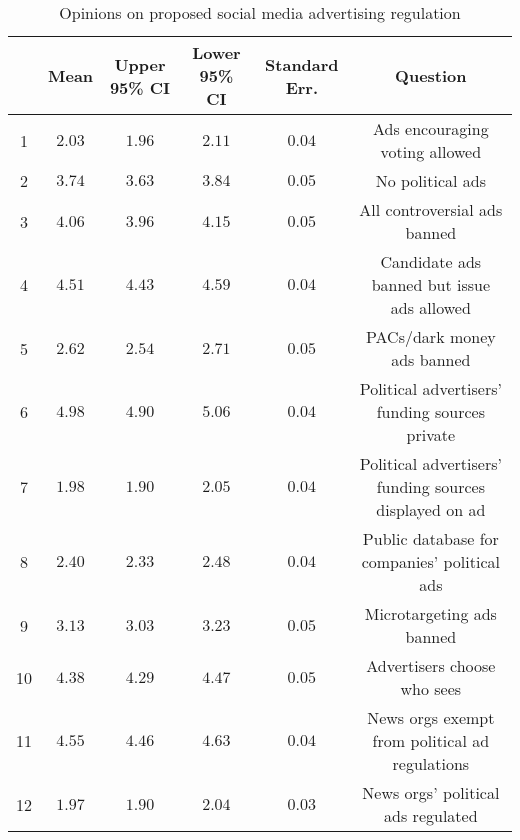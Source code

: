 
\begin{table}[!htbp] \centering 
  \caption{Opinions on proposed social media advertising regulation} 
  \label{table:ad-reg} 
\begin{tabular}{@{\extracolsep{5pt}} cccccc} 
\toprule 
 & Mean & Upper 95\% CI & Lower 95\% CI & Standard Err. & Question \\ 
\midrule 1 & $2.03$ & $1.96$ & $2.11$ & $0.04$ & Ads encouraging voting allowed \\ 
2 & $3.74$ & $3.63$ & $3.84$ & $0.05$ & No political ads \\ 
3 & $4.06$ & $3.96$ & $4.15$ & $0.05$ & All controversial ads banned \\ 
4 & $4.51$ & $4.43$ & $4.59$ & $0.04$ & Candidate ads banned but issue ads allowed \\ 
5 & $2.62$ & $2.54$ & $2.71$ & $0.05$ & PACs/dark money ads banned \\ 
6 & $4.98$ & $4.90$ & $5.06$ & $0.04$ & Political advertisers' funding sources private \\ 
7 & $1.98$ & $1.90$ & $2.05$ & $0.04$ & Political advertisers' funding sources displayed on ad \\ 
8 & $2.40$ & $2.33$ & $2.48$ & $0.04$ & Public database for companies' political ads \\ 
9 & $3.13$ & $3.03$ & $3.23$ & $0.05$ & Microtargeting ads banned \\ 
10 & $4.38$ & $4.29$ & $4.47$ & $0.05$ & Advertisers choose who sees \\ 
11 & $4.55$ & $4.46$ & $4.63$ & $0.04$ & News orgs exempt from political ad regulations  \\ 
12 & $1.97$ & $1.90$ & $2.04$ & $0.03$ & News orgs' political ads regulated \\ 
\bottomrule 
\end{tabular} 
\end{table} 

